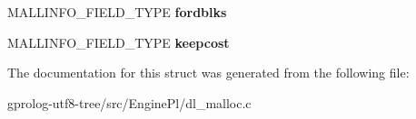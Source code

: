 \begin{DoxyCompactItemize}
\item 
M\+A\+L\+L\+I\+N\+F\+O\+\_\+\+F\+I\+E\+L\+D\+\_\+\+T\+Y\+PE {\bfseries fordblks}\hypertarget{structmallinfo_a2fc75bf31817d4a64d0a6970aa5278dd}{}\label{structmallinfo_a2fc75bf31817d4a64d0a6970aa5278dd}

\item 
M\+A\+L\+L\+I\+N\+F\+O\+\_\+\+F\+I\+E\+L\+D\+\_\+\+T\+Y\+PE {\bfseries keepcost}\hypertarget{structmallinfo_a9cd2ce910ff603217426d9b1b7c0e430}{}\label{structmallinfo_a9cd2ce910ff603217426d9b1b7c0e430}

\end{DoxyCompactItemize}


The documentation for this struct was generated from the following file\+:\begin{DoxyCompactItemize}
\item 
gprolog-\/utf8-\/tree/src/\+Engine\+Pl/dl\+\_\+malloc.\+c\end{DoxyCompactItemize}
